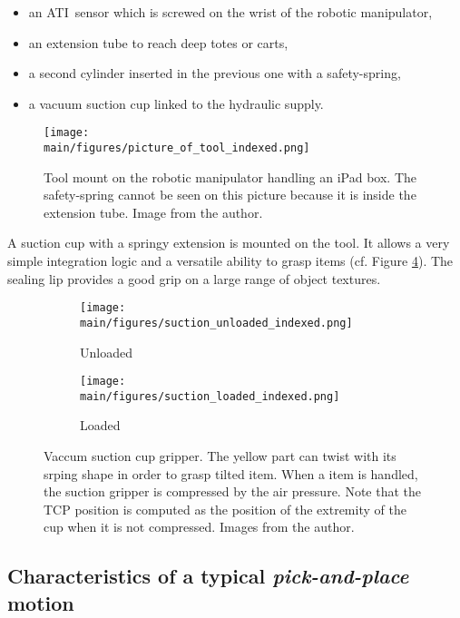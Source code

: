\documentclass[/home/francois/latex/report/main.tex]{subfiles}
\begin{document}
\begin{itemize}
  \item an ATI\texttrademark \ sensor which is screwed on the wrist of the robotic manipulator,
  \item an extension tube to reach deep totes or carts,
  \item a second cylinder inserted in the previous one with a safety-spring,
  \item a vacuum suction cup linked to the hydraulic supply.
\end{itemize}

\begin{figure}[H]
  \centering
  \texttt{[image: \\main/figures/picture\_of\_tool\_indexed.png]}
  \caption{Tool mount on the robotic manipulator handling an iPad box. The safety-spring cannot be seen on this picture because it is inside the extension tube. Image from the author.}
  \label{fig:background:tool}
\end{figure}

A suction cup with a springy extension is mounted on the tool. It allows a very simple integration logic and a versatile ability to grasp items (cf. Figure \ref{fig:background:suction}). The sealing lip provides a good grip on a large range of object textures.

\begin{figure}[H]
\centering
\begin{subfigure}{0.49\textwidth}
\centering
\texttt{[image: \\main/figures/suction\_unloaded\_indexed.png]}
\caption{Unloaded}
\label{fig:background:suction-unloaded}
\end{subfigure}
\begin{subfigure}{0.49\textwidth}
\centering
\texttt{[image: \\main/figures/suction\_loaded\_indexed.png]}
\caption{Loaded}
\label{fig:background:suction-loaded}
\end{subfigure}
\caption{Vaccum suction cup gripper. The yellow part can twist with its srping shape in order to grasp tilted item. When a item is handled, the suction gripper is compressed by the air pressure. Note that the \ac{TCP} position is computed as the position of the extremity of the cup when it is not compressed. Images from the author.}
\label{fig:background:suction}
\end{figure}

\subsection{Characteristics of a typical \textit{pick-and-place} motion}
\label{background:motion}
\end{document}
